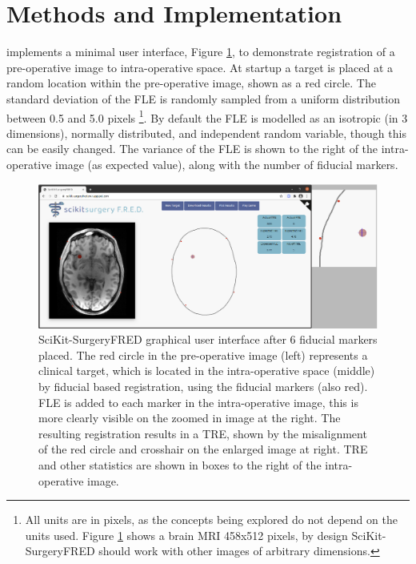 \section{Methods and Implementation}
\label{sec:methods}
\fred implements a minimal user interface, Figure \ref{fig:surgery_fred}, to demonstrate registration of a pre-operative image to intra-operative space. At startup a target is placed at a random location within the pre-operative image, shown as a red circle. The standard deviation of the \gls{FLE} is randomly sampled from a uniform distribution 
between 0.5 and 5.0 pixels \footnote{All units are in pixels, as the concepts being explored do not depend on the units used. Figure 
\ref{fig:surgery_fred} shows a brain MRI 458x512 pixels, by design SciKit-SurgeryFRED should work with other images 
of arbitrary dimensions.}. By default the \gls{FLE} is modelled as an isotropic (in 3 dimensions), normally distributed, and independent random variable, though this can be easily changed. 
The variance of the \gls{FLE} is shown to the right of the intra-operative image (as expected value), along with the number of fiducial markers. 

\begin{figure}
	\begin{center}
	\includegraphics[width=\linewidth]{scikit-surgeryfred_gui.eps}
		\caption{\label{fig:surgery_fred}SciKit-SurgeryFRED graphical user interface after 6 fiducial markers placed. The red circle in the pre-operative image (left) represents a clinical target, which is located in the
		intra-operative space (middle) by fiducial based registration, using the fiducial markers (also red). FLE is added to each marker in the intra-operative image, this is more clearly visible on the zoomed in image at the right. The resulting registration results in a TRE, shown by the misalignment of the red circle and crosshair 
		on the enlarged image at right. TRE and other statistics are shown in boxes to the right of the intra-operative image.}
	\end{center}
\end{figure}

